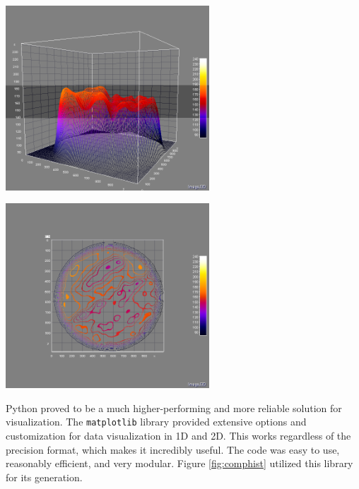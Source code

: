 \documentclass[11pt, letterpaper, notitlepage]{article}
\newenvironment{Figure}
  {\par\medskip\noindent\minipage{\linewidth}}
  {\endminipage\par\medskip}
\begin{document}
\begin{multicols}{2}

\begin{Figure}
  \centering
  \includegraphics[width=3in]{images/Norm_Slice_Line_Plot_Angled.png}
  \label{fig:aij3dline}
\end{Figure}

\begin{Figure}
  \centering
  \includegraphics[width=3in]{images/Norm_Slice_Isoline_Plot_Top-Down.png}
  \label{fig:aij3disoline}
\end{Figure}

Python proved to be a much higher-performing and more reliable solution for visualization. The \verb|matplotlib|\cite{hunter_matplotlib_2007} library provided extensive options and customization for data visualization in 1D and 2D. This works regardless of the precision format, which makes it incredibly useful. The code was easy to use, reasonably efficient, and very modular. Figure \ref{fig:comphist} utilized this library for its generation.


\end{multicols}
\end{document}
